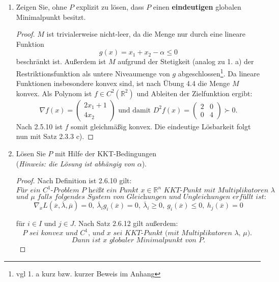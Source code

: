 \documentclass[12pt]{extreport} %
\newcommand{\R}{\mathbb{R}}
\theoremstyle{named}
\theoremstyle{nnamed}
\theoremstyle{itshape}
\theoremstyle{normal}
\begin{document}
\begin{enumerate}
	\item Zeigen Sie, ohne $P$ explizit zu lösen, dass $P$ einen \textbf{eindeutigen} globalen Minimalpunkt besitzt.
		\begin{proof}
			 $M$ ist trivialerweise nicht-leer, da die Menge nur durch eine lineare Funktion 
			 $$g(x) = x_1+x_2-\alpha \leq 0$$
			  beschränkt ist. Außerdem ist $M$ aufgrund der Stetigkeit (analog zu 1. a) der Restriktionsfunktion als untere Niveaumenge von $g$ abgeschlossen\footnote{vgl 1. a kurz bzw. kurzer Beweis im Anhang}. Da lineare Funktionen insbesondere konvex sind, ist nach Übung 4.4 die Menge $M$ konvex. Als Polynom ist $f \in C^2(\R^2)$ und Ableiten der Zielfunktion ergibt: \\
				$$ \nabla f(x) = \begin{pmatrix} 2x_1+1 \\ 4x_2 \end{pmatrix} \text{ und damit } D^2f(x) = \begin{pmatrix} 2 & 0 \\ 0 & 4 \end{pmatrix} \succ 0. $$
 			Nach 2.5.10 ist $f$ somit gleichmäßig konvex. Die eindeutige Lösbarkeit folgt nun mit Satz 2.3.3 c). 
		\end{proof}
	\item Lösen Sie $P$ mit Hilfe der KKT-Bedingungen ~\\
		(\textit{Hinweis: die Lösung ist abhängig von $\alpha$}).
		\begin{proof}
			Nach Definition ist 2.6.10 gilt:
			$$\textit{Für ein $C^1$-Problem $P$ heißt ein Punkt $x \in \R^n$ KKT-Punkt mit Multiplikatoren $\lambda$}$$
			$$\textit{und $\mu$ falls folgendes System von Gleichungen und Ungleichungen erfüllt ist:} $$
			$$ \nabla_x L(\overline{x}, \overline{\lambda}, \overline{\mu}) = 0, ~ \overline{\lambda}_i g_i(\overline{x}) = 0, ~\overline{\lambda}_i \geq 0, ~g_i(\overline{x}) \leq 0, ~ h_j(\overline{x}) = 0  $$
		
			für $i \in I$ und $j \in J$. Nach Satz 2.6.12 gilt außerdem:
			$$\textit{$P$ sei konvex und $C^1$, und $x$ sei KKT-Punkt (mit Multiplikatoren $\lambda$, $\mu$). }$$
			$$ \textit{Dann ist $x$ globaler Minimalpunkt von $P$.} $$
			

\end{proof}
\end{enumerate}
\end{document}

